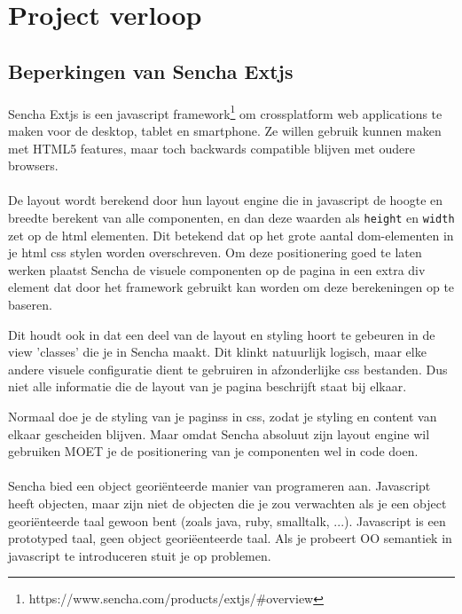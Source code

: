 \section {Project verloop}


\subsection {Beperkingen van Sencha Extjs}

\paragraph {} Sencha Extjs is een javascript
framework\footnote{https://www.sencha.com/products/extjs/\#overview} om crossplatform web
applications te maken voor de desktop, tablet en smartphone. Ze willen gebruik kunnen maken
met HTML5 features, maar toch backwards compatible blijven met oudere browsers.

\paragraph {} De layout wordt berekend door hun layout engine die in javascript de hoogte
en breedte berekent van alle componenten, en dan deze waarden als \lstinline{height} en
\lstinline{width} zet op de html elementen. Dit betekend dat op het grote aantal dom-elementen
in je html css stylen worden overschreven. Om deze positionering goed te laten
werken plaatst Sencha de visuele componenten op de pagina in een extra div element dat door het
framework gebruikt kan worden om deze berekeningen op te baseren.

Dit houdt ook in dat een deel van de layout en styling hoort te gebeuren in de view
'classes' die je in Sencha maakt. Dit klinkt natuurlijk logisch, maar elke andere visuele
configuratie dient te gebruiren in afzonderlijke css bestanden. Dus niet alle informatie
die de layout van je pagina beschrijft staat bij elkaar.

Normaal doe je de styling van je paginss in css, zodat je styling en content van elkaar
gescheiden blijven. Maar omdat Sencha absoluut zijn layout engine wil gebruiken MOET je de
positionering van je componenten wel in code doen.

\paragraph {} Sencha bied een object georiënteerde manier van programeren aan. Javascript
heeft objecten, maar zijn niet de objecten die je zou verwachten als je een object
georiënteerde taal gewoon bent (zoals java, ruby, smalltalk, ...). Javascript is een
prototyped taal, geen object georiëenteerde taal. Als je probeert OO semantiek in
javascript te introduceren stuit je op problemen.

